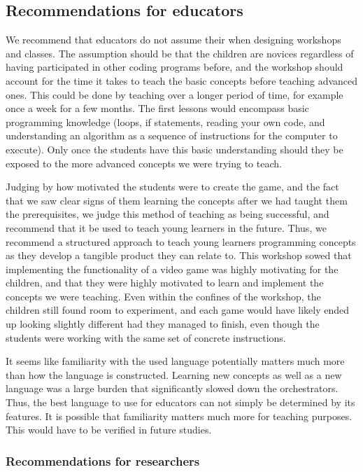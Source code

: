 \subsection{Recommendations for educators}
We recommend that educators do not assume their when designing workshops and classes.
The assumption should be that the children are novices regardless of having participated in other coding programs before, and the workshop should account for the time it takes to teach the basic concepts before teaching advanced ones.
This could be done by teaching over a longer period of time, for example once a week for a few months.
The first lessons would encompass basic programming knowledge (loops, if statements, reading your own code, and understanding an algorithm as a sequence of instructions for the computer to execute).
Only once the students have this basic understanding should they be exposed to the more advanced concepts we were trying to teach.

Judging by how motivated the students were to create the game, and the fact that we saw clear signs of them learning the concepts after we had taught them the prerequisites, we judge this method of teaching as being successful, and recommend that it be used to teach young learners in the future.
Thus, we recommend a structured approach to teach young learners programming concepts as they develop a tangible product they can relate to.
This workshop sowed that implementing the functionality of a video game was highly motivating for the children, and that they were highly motivated to learn and implement the concepts we were teaching.
Even within the confines of the workshop, the children still found room to experiment, and each game would have likely ended up looking slightly different had they managed to finish, even though the students were working with the same set of concrete instructions.

It seems like familiarity with the used language potentially matters much more than how the language is constructed.
Learning new concepts as well as a new language was a large burden that significantly slowed down the orchestrators.
Thus, the best language to use for educators can not simply be determined by its features.
It is possible that familiarity matters much more for teaching purposes.
This would have to be verified in future studies.

\subsubsection{Recommendations for researchers}


